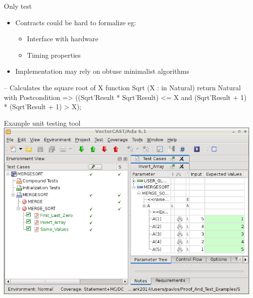 \documentclass{beamer}
\begin{document}
\begin{frame}[fragile]{Only test}
  \begin{itemize}
     \item Contracts could be hard to formalize eg:
     \begin{itemize}
        \item Interface with hardware
        \item Timing properties
     \end{itemize}
     \item Implementation may rely on obtuse minimalist algorithms
  \end{itemize}
  \begin{pxcode}[language=SPARK,style=magic,gobble=0]

  --  Calculates the square root of X
  function Sqrt (X : in Natural) return Natural 
  with Postcondition =>
         ((Sqrt'Result * Sqrt'Result) <= X and
          (Sqrt'Result + 1) * (Sqrt'Result + 1) > X);



  \end{pxcode}
\end{frame}
\begin{frame}[fragile]{Example unit testing tool}
  \includegraphics[width=\textwidth]{VectorCAST_resized.jpg}
\end{frame}
\end{document}
